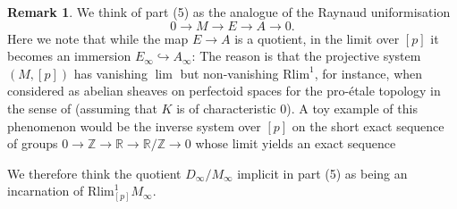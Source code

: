 \documentclass[10pt,oneside]{amsart}
\theoremstyle{definition}
\newtheorem{remark}[theorem]{Remark}
\begin{document}
	\begin{remark}
		
	We think of part (5) as the analogue of the Raynaud uniformisation
		\[0\to M\to E\to A\to 0.\]
	Here we note that while the map $E\to A$ is a quotient, in the limit over $[p]$ it becomes an immersion $E_\infty\hookrightarrow A_\infty$: The reason is that the projective system $(M,[p])$ has vanishing $\lim$ but non-vanishing $\mathrm{Rlim}^1$, for instance, when considered as abelian sheaves on perfectoid spaces for the pro-\'etale topology in the sense of \cite{etale_cohomology_of_diamonds} (assuming that $K$ is of characteristic $0$). A toy example of this phenomenon would be the inverse system over $[p]$ on the short exact sequence of groups 
	$0 \to\mathbb Z \to\mathbb R \to \mathbb R/\mathbb Z \to 0$
	whose limit yields an exact sequence
	\begin{center}
	\end{center}
	We therefore think the quotient $D_\infty/M_\infty$ implicit in part (5) as being an incarnation of $\mathrm{Rlim}^1_{[p]}M_\infty$.
\end{remark}
\end{document}
